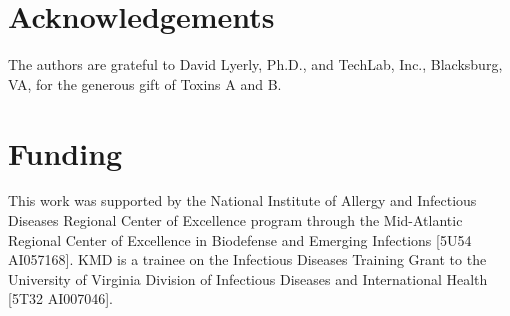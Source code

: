 \section{Acknowledgements}
The authors are grateful to David Lyerly, Ph.D., and TechLab, Inc., Blacksburg, VA, for the generous gift of Toxins A and B.

\section{Funding}
This work was supported by the National Institute of Allergy and Infectious Diseases Regional Center of Excellence program through the Mid-Atlantic Regional Center of Excellence in Biodefense and Emerging Infections [5U54 AI057168]. KMD is a trainee on the Infectious Diseases Training Grant to the University of Virginia Division of Infectious Diseases and International Health [5T32 AI007046].






